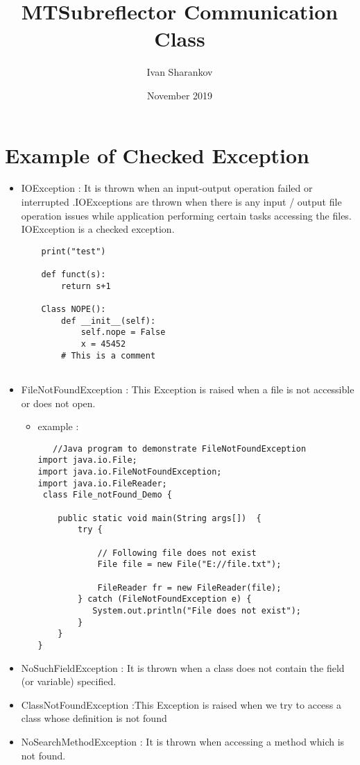\documentclass{article}
\title{MTSubreflector Communication Class}
\author{Ivan Sharankov }
\date{November 2019}
\begin{document}
\maketitle

\section{Example of Checked Exception}
\begin{itemize}
    \item IOException : It is thrown when an input-output operation failed or interrupted .IOExceptions are thrown when there is any input / output file operation issues while application performing certain tasks accessing the files. IOException is a checked exception.
    
    \begin{itemize}
    \begin{lstlisting}
    print("test")
    
    def funct(s):
        return s+1
        
    Class NOPE():
        def __init__(self):
            self.nope = False
            x = 45452
        # This is a comment 
   
    \end{lstlisting}
    \end{itemize}
    \item FileNotFoundException : This Exception is raised when a file is not accessible or does not open.
    
    \begin{itemize}
    \item example :
    \begin{lstlisting}
   //Java program to demonstrate FileNotFoundException 
import java.io.File; 
import java.io.FileNotFoundException; 
import java.io.FileReader; 
 class File_notFound_Demo { 
  
    public static void main(String args[])  { 
        try { 
  
            // Following file does not exist 
            File file = new File("E://file.txt"); 
  
            FileReader fr = new FileReader(file); 
        } catch (FileNotFoundException e) { 
           System.out.println("File does not exist"); 
        } 
    } 
} 
    \end{lstlisting}
     \end{itemize}
    
    \item NoSuchFieldException : It is thrown when a class does not contain the field (or variable) specified.
    
    
    \item ClassNotFoundException :This Exception is raised when we try to access a class whose definition is not found
    
    \item NoSearchMethodException : It is thrown when accessing a method which is not found.
\end{itemize}
\end{document}
